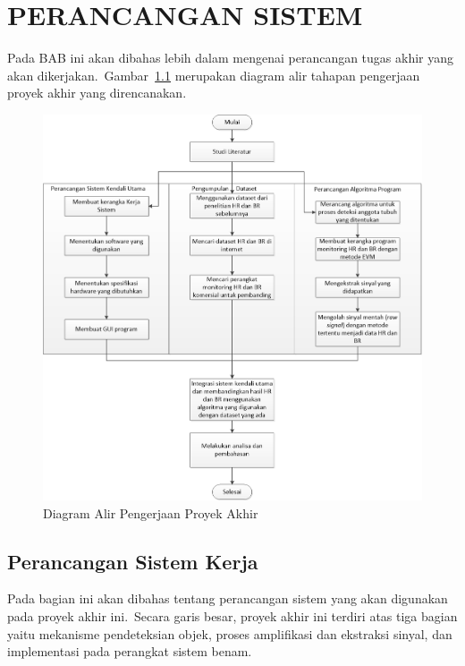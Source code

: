 \chapter{PERANCANGAN SISTEM}

\ifpdf
    \graphicspath{{Chapter3/Figs/Raster/}{Chapter3/Figs/PDF/}{Chapter3/Figs/}}
\else
    \graphicspath{{Chapter3/Figs/Vector/}{Chapter3/Figs/}}
\fi
Pada BAB ini akan dibahas lebih dalam mengenai perancangan tugas akhir yang akan dikerjakan.~Gambar~\ref{fig:FlowChart} merupakan diagram alir tahapan pengerjaan proyek akhir yang direncanakan. 

\begin{figure}[ht]
	\centering
	\includegraphics[width=\textwidth]{FlowChart}
	\caption{Diagram Alir Pengerjaan Proyek Akhir}
	\label{fig:FlowChart}   
\end{figure}

\section{Perancangan Sistem Kerja}
Pada bagian ini akan dibahas tentang perancangan sistem yang akan digunakan pada proyek akhir ini.~Secara garis besar, proyek akhir ini terdiri atas tiga bagian yaitu mekanisme pendeteksian objek, proses amplifikasi dan ekstraksi sinyal,  dan implementasi pada perangkat sistem benam.


